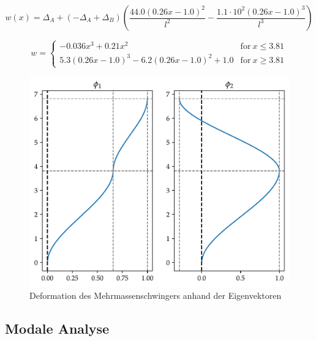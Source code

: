 \documentclass[
  letterpaper,
  DIV=11]{scrreprt}
\begin{document}
\begin{equation}w{\left(x \right)} = \Delta_{A} + \left(- \Delta_{A} + \Delta_{B}\right) \left(\frac{44.0 \left(0.26 x - 1.0\right)^{2}}{l^{2}} - \frac{1.1 \cdot 10^{2} \left(0.26 x - 1.0\right)^{3}}{l^{3}}\right)\end{equation}

\begin{equation}w = \begin{cases} - 0.036 x^{3} + 0.21 x^{2} & \text{for}\: x \leq 3.81 \\5.3 \left(0.26 x - 1.0\right)^{3} - 6.2 \left(0.26 x - 1.0\right)^{2} + 1.0 & \text{for}\: x \geq 3.81 \end{cases}\end{equation}

\begin{figure}[H]

{\centering \includegraphics{index_files/mediabag/mms_06_files/figure-pdf/fig-eigenvektoren-output-1.pdf}

}

\caption{\label{fig-eigenvektoren}Deformation des Mehrmassenschwingers
anhand der Eigenvektoren}

\end{figure}

\hypertarget{modale-analyse-2}{%
\subsection{Modale Analyse}\label{modale-analyse-2}}
\end{document}
